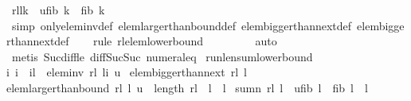 \begin{isabellebody}
{\isasymLongrightarrow}\ rl{\isacharbang}{\isacharparenleft}l{\isacharminus}{}{\isacharminus}k{\isacharparenright}\ {\isasymge}\ u{\isacharasterisk}{\isacharparenleft}fib\ k{\isacharparenright}\ {\isacharplus}\ {\isacharparenleft}fib{}\ k{\isacharparenright}{\isachardoublequoteclose}\isanewline
%
\isadelimproof
\ \ %
\endisadelimproof
%
\isatagproof
{}\isamarkupfalse%
\ {\isacharparenleft}simp\ only{\isacharcolon}elem{\isacharunderscore}inv{\isacharunderscore}def\ elem{\isacharunderscore}larger{\isacharunderscore}than{\isacharunderscore}bound{\isacharunderscore}def\ elem{\isacharunderscore}bigger{\isacharunderscore}than{\isacharunderscore}next{\isacharunderscore}{}{\isacharunderscore}def\ elem{\isacharunderscore}bigger{\isacharunderscore}than{\isacharunderscore}next{\isacharunderscore}def{\isacharparenright}\isanewline
\ \ \isamarkupfalse%
\ {\isacharparenleft}rule\ rl{\isacharunderscore}elem{\isacharunderscore}lower{\isacharunderscore}bound{\isacharparenright}\isanewline
\ \ \ \ \ \ \ \isamarkupfalse%
\ auto\isanewline
\ \ \isamarkupfalse%
\ {\isacharparenleft}metis\ Suc{\isacharunderscore}diff{\isacharunderscore}le\ diff{\isacharunderscore}Suc{\isacharunderscore}Suc\ numeral{\isacharunderscore}{}{\isacharunderscore}eq{\isacharunderscore}{}{\isacharparenright}%
\endisatagproof
{\isafoldproof}%
%
\isadelimproof
\isanewline
%
\endisadelimproof
\isanewline
{}\isamarkupfalse%
\ run{\isacharunderscore}len{\isacharunderscore}sum{\isacharunderscore}lower{\isacharunderscore}bound{\isacharcolon}\ {\isachardoublequoteopen}\isanewline
{\isasymforall}i{\isachardot}\ {}{\isasymle}i\ {\isasymand}\ i{\isasymle}l\ {\isasymlongrightarrow}\ elem{\isacharunderscore}inv\ rl\ {\isacharparenleft}l{\isacharminus}i{\isacharparenright}\ u\ {\isasymLongrightarrow}\isanewline
elem{\isacharunderscore}bigger{\isacharunderscore}than{\isacharunderscore}next\ rl\ {\isacharparenleft}l{\isacharminus}{}{\isacharparenright}\ {\isasymLongrightarrow}\ \isanewline
elem{\isacharunderscore}larger{\isacharunderscore}than{\isacharunderscore}bound\ rl\ {\isacharparenleft}l{\isacharminus}{}{\isacharparenright}\ u\ {\isasymLongrightarrow}\ length\ rl\ {\isacharequal}\ l\ {\isasymLongrightarrow}\ l{\isasymge}{}\isanewline
{\isasymLongrightarrow}\ sumn\ rl\ l\ {\isasymge}\ u{\isacharasterisk}{\isacharparenleft}{\isacharparenleft}fib\ {\isacharparenleft}l{\isacharplus}{}{\isacharparenright}{\isacharparenright}{\isacharminus}{}{\isacharparenright}\ {\isacharplus}\ {\isacharparenleft}{\isacharparenleft}fib{}\ {\isacharparenleft}l{\isacharplus}{}{\isacharparenright}{\isacharparenright}\ {\isacharminus}\ {\isacharparenleft}l{\isacharplus}{}{\isacharparenright}{\isacharparenright}{\isachardoublequoteclose}\isanewline

\end{isabellebody}
